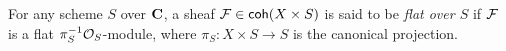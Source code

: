 






\begin{definition}
    \label{F is flat over S}
    For any scheme $S$ over $\mathbf C$, a sheaf $\mathcal F \in \mathsf{coh}(X \times S)$ is said to be \emph{flat over $S$} if $\mathcal F$ is a flat $\pi_S^{-1} {\mathcal{O}_{S}}$-module, where $\pi_S \colon X \times S \to S$ is the canonical projection. 
\end{definition}
 

